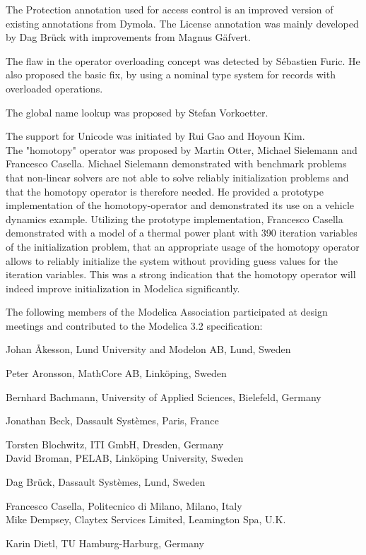 \documentclass[10pt,a4paper]{report}
\begin{document}
The Protection annotation used for access control is an improved version
of existing annotations from Dymola. The License annotation was mainly
developed by Dag Brück with improvements from Magnus Gäfvert.

The flaw in the operator overloading concept was detected by Sébastien
Furic. He also proposed the basic fix, by using a nominal type system
for records with overloaded operations.

The global name lookup was proposed by Stefan Vorkoetter.

The support for Unicode was initiated by Rui Gao and Hoyoun Kim.\\
The "homotopy" operator was proposed by Martin Otter, Michael Sielemann
and Francesco Casella. Michael Sielemann demonstrated with benchmark
problems that non-linear solvers are not able to solve reliably
initialization problems and that the homotopy operator is therefore
needed. He provided a prototype implementation of the homotopy-operator
and demonstrated its use on a vehicle dynamics example. Utilizing the
prototype implementation, Francesco Casella demonstrated with a model of
a thermal power plant with 390 iteration variables of the initialization
problem, that an appropriate usage of the homotopy operator allows to
reliably initialize the system without providing guess values for the
iteration variables. This was a strong indication that the homotopy
operator will indeed improve initialization in Modelica significantly.

The following members of the Modelica Association participated at design
meetings and contributed to the Modelica 3.2 specification:

Johan Åkesson, Lund University and Modelon AB, Lund, Sweden

Peter Aronsson, MathCore AB, Linköping, Sweden

Bernhard Bachmann, University of Applied Sciences, Bielefeld, Germany

Jonathan Beck, Dassault Systèmes, Paris, France

Torsten Blochwitz, ITI GmbH, Dresden, Germany\\
David Broman, PELAB, Linköping University, Sweden

Dag Brück, Dassault Systèmes, Lund, Sweden

Francesco Casella, Politecnico di Milano, Milano, Italy\\
Mike Dempsey, Claytex Services Limited, Leamington Spa, U.K.

Karin Dietl, TU Hamburg-Harburg, Germany
\end{document}

